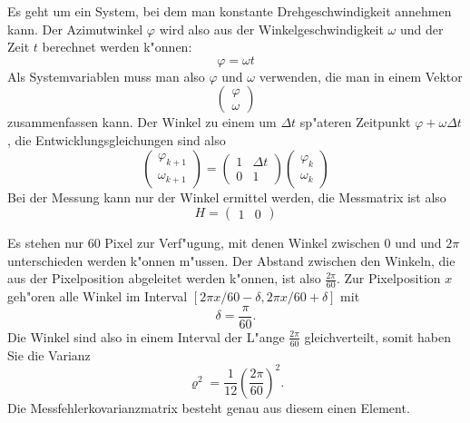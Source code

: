 \begin{loesung}
\begin{teilaufgaben}
\item
Es geht um ein System, bei dem man konstante Drehgeschwindigkeit annehmen
kann. Der Azimutwinkel $\varphi$ wird also aus der Winkelgeschwindigkeit
$\omega$ und der Zeit $t$ berechnet werden k"onnen:
\[
\varphi=\omega t
\]
Als Systemvariablen muss man also $\varphi$ und $\omega$ verwenden,
die man in einem Vektor
\[
\begin{pmatrix}\varphi\\\omega\end{pmatrix}
\]
zusammenfassen kann. Der Winkel zu einem um $\Delta t$ sp"ateren Zeitpunkt
$\varphi+\omega\Delta t$, die Entwicklungsgleichungen sind also
\[
\begin{pmatrix}\varphi_{k+1}\\\omega_{k+1}\end{pmatrix}
=\begin{pmatrix}1&\Delta t\\0&1\end{pmatrix}
\begin{pmatrix}\varphi_k\\\omega_k\end{pmatrix}
\]
Bei der Messung kann nur der Winkel ermittel werden, die Messmatrix ist
also
\[
H=\begin{pmatrix}1&0\end{pmatrix}
\]
\item
Es stehen nur 60 Pixel zur Verf"ugung, mit denen Winkel zwischen $0$ und
und $2\pi$ unterschieden werden k"onnen m"ussen.
Der Abstand zwischen den Winkeln, die aus der Pixelposition abgeleitet
werden k"onnen, ist also $\frac{2\pi}{60}$. Zur Pixelposition $x$ geh"oren
alle Winkel im Interval $[2\pi x/60-\delta, 2\pi x/60+\delta]$ mit
\[
\delta=\frac{\pi}{60}.
\]
Die Winkel sind also in einem Interval der L"ange $\frac{2\pi}{60}$ gleichverteilt,
somit haben Sie die Varianz
\[
\varrho^2=\frac1{12}\left(\frac{2\pi}{60}\right)^2.
\]
Die Messfehlerkovarianzmatrix besteht genau aus diesem einen Element.
\end{teilaufgaben}
\end{loesung}

